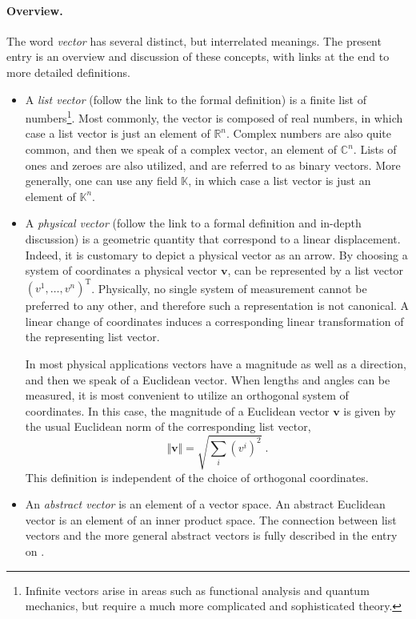 \documentclass[12pt]{article}
\newcommand{\reals}{\mathbb{R}}
\newcommand{\cnums}{\mathbb{C}}
\newcommand{\bv}{\mathbf{v}}
\newcommand{\supt}{^{\scriptscriptstyle\mathrm{T}}}
\newcommand{\kfield}{\mathbb{K}}
\begin{document}
\paragraph{Overview.}
The word \emph{vector} has several distinct, but interrelated
meanings.  The present entry is an overview and discussion of these
concepts, with links at the end to more detailed definitions.

\begin{itemize}
\item A \emph{list vector} (follow the link to the formal definition)
  is a finite list of numbers\footnote{Infinite vectors arise in areas
    such as functional analysis and quantum mechanics, but require a
    much more complicated and sophisticated theory.}.  Most commonly,
  the vector is composed of real numbers, in which case a list vector
  is just an element of $\reals^n$.  Complex numbers are also quite
  common, and then we speak of a complex vector, an element of
  $\cnums^n$.  Lists of ones and zeroes are also utilized, and are
  referred to as binary vectors.  More generally, one can use any
  field $\kfield$, in which case a list vector is just an element of
  $\kfield^n$.
\item A \emph{physical vector} (follow the link to a formal definition
  and in-depth discussion) is a geometric quantity that correspond to
  a linear displacement. Indeed, it is customary to depict a physical
  vector as an arrow.  By choosing a system of coordinates a physical
  vector $\bv$, can be represented by a list vector
  $(v^1,\ldots,v^n)\supt$.  Physically, no single system of
  measurement cannot be preferred to any other, and therefore such a
  representation is not canonical.  A linear change of coordinates
  induces a corresponding linear transformation of the representing
  list vector.

  
  In most physical applications vectors have a magnitude as well as a
  direction, and then we speak of a Euclidean vector.  When lengths
  and angles can be measured, it is most convenient to utilize an
  orthogonal system of coordinates.  In this case, the magnitude of a
  Euclidean vector $\bv$ is given by the usual Euclidean norm of the
  corresponding list vector,
  $$\Vert \bv \Vert = \sqrt{{\textstyle \sum_i} (v^i)^2}\;.$$
  This
  definition is independent of the choice of orthogonal coordinates.
  
\item An \emph{abstract vector} is an element of a vector space.  An
  abstract Euclidean vector is an element of an inner product space.
  The connection
  between list vectors and the more general abstract vectors is fully
  described in the entry on .  
  

\end{itemize}
\end{document}
